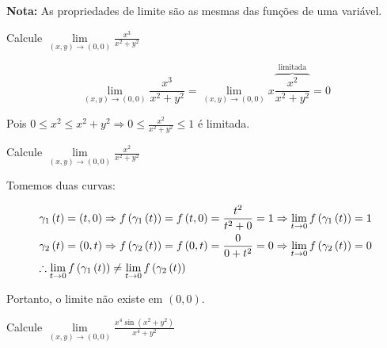 \documentclass{book}
\begin{document}
\textbf{Nota:} As propriedades de limite s\~ao as mesmas das fun\c c\~oes de uma vari\'avel.

\begin{ex}
    Calcule $\mathop {\lim }\limits_{\left( {x,y} \right) \to \left( {0,0} \right)} \frac{{x^3 }}{{x^2  + y^2 }}$
\end{ex}

\begin{sol}
\[
    \mathop {\lim }\limits_{\left( {x,y} \right) \to \left( {0,0} \right)} \frac{{x^3 }}{{x^2  + y^2 }} = \mathop {\lim }\limits_{\left( {x,y} \right) \to \left( {0,0} \right)} x\overbrace {\frac{{x^2 }}
{{x^2  + y^2 }}}^{{\text{limitada}}} = 0
\]

    Pois $0 \leqslant x^2  \leqslant x^2  + y^2  \Rightarrow 0 \leqslant \frac{{x^2 }}
{{x^2  + y^2 }} \leqslant 1$ \'e limitada.
\end{sol}

\begin{ex}
    Calcule $\mathop {\lim }\limits_{\left( {x,y} \right) \to \left( {0,0} \right)} \frac{{x^2 }}{{x^2  + y^2 }}$
\end{ex}

\begin{sol}
Tomemos duas curvas:

\[
\begin{gathered}
  \gamma _1 \left( t \right) = \left( {t,0} \right) \Rightarrow f\left( {\gamma _1 \left( t \right)} \right) = f\left( {t,0} \right) = \frac{{t^2 }}
{{t^2  + 0}} = 1 \Rightarrow \mathop {\lim }\limits_{t \to 0} f\left( {\gamma _1 \left( t \right)} \right) = 1 \hfill \\
  \gamma _2 \left( t \right) = \left( {0,t} \right) \Rightarrow f\left( {\gamma _2 \left( t \right)} \right) = f\left( {0,t} \right) = \frac{0}
{{0 + t^2 }} = 0 \Rightarrow \mathop {\lim }\limits_{t \to 0} f\left( {\gamma _2 \left( t \right)} \right) = 0 \hfill \\
  \therefore \mathop {\lim }\limits_{t \to 0} f\left( {\gamma _1 \left( t \right)} \right) \ne \mathop {\lim }\limits_{t \to 0} f\left( {\gamma _2 \left( t \right)} \right) \hfill \\
\end{gathered}
\]

Portanto, o limite n\~ao existe em $(0,0)$.
\end{sol}

\begin{ex}
    Calcule $\mathop {\lim }\limits_{\left( {x,y} \right) \to \left( {0,0} \right)} \frac{{x^4 \sin \left( {x^2  + y^2 } \right)}}{{x^4  + y^2 }}$
\end{ex}
\end{document}

